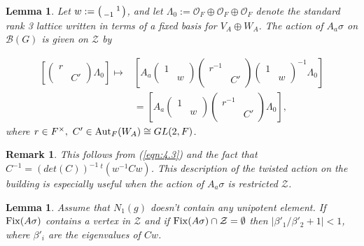\documentclass[12pt,letterpaper]{amsart}
\numberwithin{equation}{section}
\newtheorem{lemma}[theorem]{Lemma}
\newtheorem{remark}{Remark}
\theoremstyle{definition}
\theoremstyle{plain}
\providecommand{\cal}{\mathcal}
\def\zz{{\cal Z}}
\def\off{{\cal O}_F}
\def\bbg{{\cal B}(G)}
\begin{document}
\begin{lemma}
\label{lemma:5.3}
Let $w:=\left(\smallmatrix \ &1\\-1&\ \endsmallmatrix
\right)$, and let $\Lambda_0:=\off\oplus\off\oplus\off$ denote the standard
rank 3 lattice written in terms of a fixed basis for $V_A\oplus W_A$.
The action of $A_a\sigma$ on $\bbg$ is given on $\zz$ by

\[
\begin{split}
\left[ 
\left(
\begin{array}{cc} 
r&\ \\\ &C'
\end{array}\right)
\Lambda_0\right] \longmapsto
&\left[ A_a
\left(
\begin{array}{cc} 
1&\ \\ \ &w
\end{array}\right)
\left(
\begin{array}{cc} 
r^{-1}&\ \\
\ &C'
\end{array}\right)
\left(
\begin{array}{cc} 
1&\ \\\ &w
\end{array}\right)^{-1}\Lambda_0\right]\\
&=\left[ A_a
\left(
\begin{array}{cc} 
1&\ \\\ &w
\end{array}\right)
\left(
\begin{array}{cc} 
r^{-1}&\ \\\ &C'
\end{array}\right)
\Lambda_0\right],
\end{split}
\]
where $r\in F^{\times},\ C'\in {\rm Aut}_F(W_A)\cong GL(2,F)$.
\end{lemma}

\begin{remark} This follows from (\ref{eqn:4.3}) and the fact that
$C^{-1}=(det(C))^{-1}\, ^t(w^{-1}Cw)$. This description of the twisted
action on the building is especially useful when the action of
$A_a\sigma$ is restricted $\zz$.
\end{remark}

\begin{lemma}
\label{lemma:5.4} 
Assume that $N_1(g)$ doesn't contain any
unipotent element. If ${\rm Fix}(A\sigma )$
contains a
vertex  in $\zz$ and if
${\rm Fix}(A\sigma )\cap\zz = \emptyset$ then $|\beta'_1/\beta'_2 +1|<1$,
where $\beta'_i$ are the eigenvalues of $Cw$.
\end{lemma}
\end{document}

